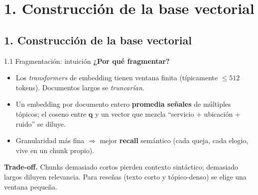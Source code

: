 \documentclass[10pt,aspectratio=169]{beamer}
\newcommand{\vq}{\mathbf{q}}
\begin{document}
%
\section*{1. Construcción de la base vectorial}

\subsection{1. Construcción de la base vectorial}

\begin{frame}{1.1 Fragmentación: intuición}
	\textbf{¿Por qué fragmentar?}
	\begin{itemize}
		\item Los \emph{transformers} de embedding tienen ventana finita
		      (típicamente $\le 512$ tokens). Documentos largos se
		      \emph{truncarían}.
		\item Un embedding por documento entero \textbf{promedia señales} de
		      múltiples tópicos; el coseno entre $\vq$ y un vector que mezcla
		      ``servicio + ubicación + ruido'' se diluye.
		\item Granularidad más fina $\Rightarrow$ mejor \textbf{recall}
		      semántico (cada queja, cada elogio, vive en un chunk propio).
	\end{itemize}

	\medskip
	\textbf{Trade-off.} Chunks demasiado cortos pierden contexto
	sintáctico; demasiado largos diluyen relevancia. Para reseñas (texto
	corto y tópico-denso) se elige una ventana pequeña.
\end{frame}

\end{document}
